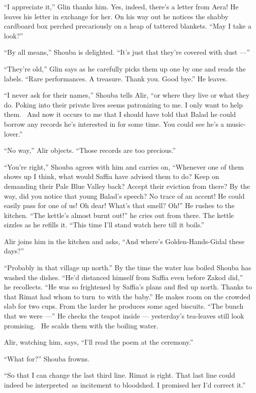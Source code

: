 \documentclass[twoside,11pt]{book}
\begin{document}
``I appreciate it,'' Glin thanks him. Yes, indeed, there's a letter from Aera!
He leaves his letter in exchange for her.
On his way out he notices the shabby cardboard box perched precariously on a heap of
tattered blankets. ``May I take a look?''

``By all means,'' Shouba is delighted. ``It's just that they're covered with dust
---''

``They're old,'' Glin says as he carefully picks them up one by one and reads the labels.
``Rare performances. A treasure. Thank you. Good bye.'' He leaves.

``I never ask for their names,'' Shouba tells Alir, ``or where they live or what they do. Poking into their
private lives seems patronizing to me. I only want to help them. ~And now it occurs to me that I should have told that
Balad he could borrow any records he's interested in for some time.  You could see he's a music-lover.''

``No way,'' Alir objects. ``Those records are too precious.''

``You're right,'' Shouba agrees with him and carries on, ``Whenever one of them
shows up I think, what would Saffia have advised them to do? Keep on demanding their Pale Blue Valley back? Accept
their eviction from there? By the way, did you notice that young Balad's speech? No trace of an accent! He could
easily pass for one of us! Oh dear! What's that smell? Oh!'' He rushes to the kitchen. ``The
kettle's almost burnt out!'' he cries out from there. The kettle sizzles as he refills it.
``This time I'll stand watch here till it boils.''

Alir joins him in the kitchen and asks, ``And where's Golden-Hands-Gidal these days?''

``Probably in that village up north.'' By the time the water has boiled Shouba has washed the
dishes. ``He'd distanced himself from Saffia even before Zakod did,'' he
recollects. ``He was so frightened by Saffia's plans and fled up north. Thanks to that Rimat had whom to
turn~to with the baby.'' He makes room on the crowded slab for two cups. From the larder he produces some
aged biscuits. ``The bunch that we were ---'' He checks the teapot inside ---  yesterday's
tea-leaves still look promising. ~He scalds them with the boiling water.

Alir, watching him, says, ``I'll read the poem at the ceremony.''

``What for?'' Shouba frowns.

``So that I can change the last third line. Rimat is right. That last line could indeed be interpreted~as
incitement to bloodshed. I promised her I'd correct it.''
\end{document}
